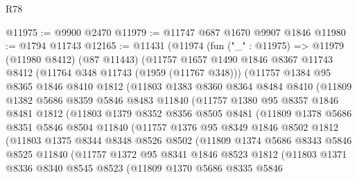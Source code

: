 \begin{lexlean}{R78}
\begin{coremodule}
@11975 := @9900 @2470
@11979 := @11747 @687 @1670 @9907 @1846
@11980 := @1794 @11743
@12165 := @11431
    (@11974
      (fun ("_" : @11975) =>
      @11979
        (@11980 @8412)
        (@87 @11443)
        (@11757
          @1657
          @1490
          @1846
          @8367
          @11743
          @8412
          (@11764 @348 @11743 (@1959 (@11767 @348)))
          (@11757
            @1384
            @95
            @8365
            @1846
            @8410
            @1812
            (@11803
              @1383
              @8360
              @8364
              @8484
              @8410
              (@11809
                @1382
                @5686
                @8359
                @5846
                @8483
                @11840
                (@11757
                  @1380
                  @95
                  @8357
                  @1846
                  @8481
                  @1812
                  (@11803
                    @1379
                    @8352
                    @8356
                    @8505
                    @8481
                    (@11809
                      @1378
                      @5686
                      @8351
                      @5846
                      @8504
                      @11840
                      (@11757
                        @1376
                        @95
                        @8349
                        @1846
                        @8502
                        @1812
                        (@11803
                          @1375
                          @8344
                          @8348
                          @8526
                          @8502
                          (@11809
                            @1374
                            @5686
                            @8343
                            @5846
                            @8525
                            @11840
                            (@11757
                              @1372
                              @95
                              @8341
                              @1846
                              @8523
                              @1812
                              (@11803
                                @1371
                                @8336
                                @8340
                                @8545
                                @8523
                                (@11809
                                  @1370
                                  @5686
                                  @8335
                                  @5846

\end{coremodule}
\end{lexlean}
